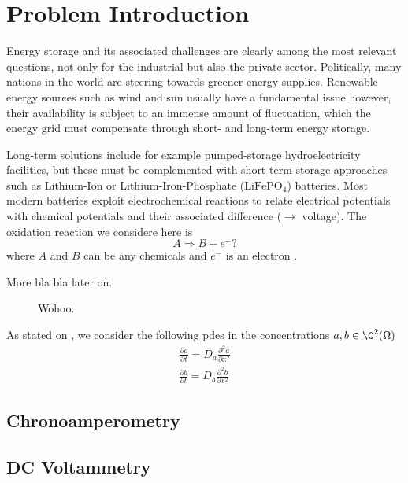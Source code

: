 \documentclass{prettytex/ox/mmsc-special-topic}
\begin{document}
  \pagebreak
  \pagestyle{normal}

  \tableofcontents
  \pagebreak

  \section{Problem Introduction}
  Energy storage and its associated challenges are clearly among the most relevant questions, not only for the industrial but also the private sector.
  Politically, many nations in the world are steering towards greener energy supplies.
  Renewable energy sources such as wind and sun usually have a fundamental issue however, their availability is subject to an immense amount of fluctuation, which the energy grid must compensate through short- and long-term energy storage.

  Long-term solutions include for example pumped-storage hydroelectricity facilities, but these must be complemented with short-term storage approaches such as Lithium-Ion or Lithium-Iron-Phosphate ($\text{LiFePO}_4$) batteries.
  Most modern batteries exploit electrochemical reactions to relate electrical potentials with chemical potentials and their associated difference ($\rightarrow$ voltage).
  The oxidation reaction we considere here is
  $$A \Rightarrow B + e^-?$$
  where $A$ and $B$ can be any chemicals and $e^-$ is an electron \parencite{Gavaghan2000Jan}.

  More bla bla later on.

  \begin{figure}[H]
    \centering
    \caption{Wohoo.}
    \label{fig:battery-schema}
  \end{figure}

  As stated on , we consider the following \gls{pde}s in the concentrations $a, b \in \C^2(\Omega)$
  \begin{align}
    \label{eq:pde-a} \frac{\partial a}{\partial t} = D_a \frac{\partial^2 a}{\partial x^2} \\
    \label{eq:pde-b} \frac{\partial b}{\partial t} = D_b \frac{\partial^2 b}{\partial x^2}
  \end{align}

  \subsection{Chronoamperometry}
  \subsection{DC Voltammetry}
\end{document}
